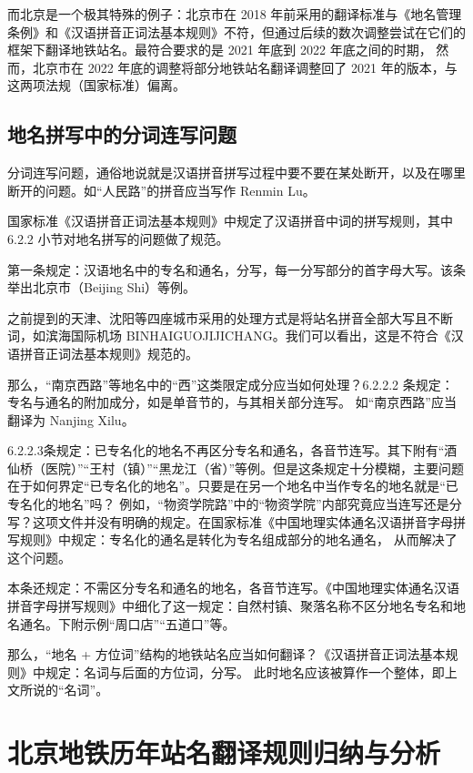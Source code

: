 \documentclass[a4paper,UTF8,12pt]{ctexart}
\begin{document}
        而北京是一个极其特殊的例子：北京市在 2018 年前采用的翻译标准与《地名管理条例》和《汉语拼音正词法基本规则》不符，但通过后续的数次调整尝试在它们的框架下翻译地铁站名。最符合要求的是 2021 年底到 2022 年底之间的时期，
        然而，北京市在 2022 年底的调整将部分地铁站名翻译调整回了 2021 年的版本，与这两项法规（国家标准）偏离。
    \subsection{地名拼写中的分词连写问题}
        分词连写问题，通俗地说就是汉语拼音拼写过程中要不要在某处断开，以及在哪里断开的问题。如“人民路”的拼音应当写作 Renmin Lu。

        国家标准《汉语拼音正词法基本规则》中规定了汉语拼音中词的拼写规则，其中 6.2.2 小节对地名拼写的问题做了规范。\cite{ref6}

        第一条规定：汉语地名中的专名和通名，分写，每一分写部分的首字母大写。该条举出北京市（Beijing Shi）等例。

        之前提到的天津、沈阳等四座城市采用的处理方式是将站名拼音全部大写且不断词，如滨海国际机场 BINHAIGUOJIJICHANG。我们可以看出，这是不符合《汉语拼音正词法基本规则》规范的。
        
        那么，“南京西路”等地名中的“西”这类限定成分应当如何处理？6.2.2.2 条规定：专名与通名的附加成分，如是单音节的，与其相关部分连写。
        如“南京西路”应当翻译为 Nanjing Xilu。

        6.2.2.3条规定：已专名化的地名不再区分专名和通名，各音节连写。其下附有“酒仙桥（医院）”“王村（镇）”“黑龙江（省）”等例。但是这条规定十分模糊，主要问题在于如何界定“已专名化的地名”。只要是在另一个地名中当作专名的地名就是“已专名化的地名”吗？
        例如，“物资学院路”中的“物资学院”内部究竟应当连写还是分写？这项文件并没有明确的规定。在国家标准《中国地理实体通名汉语拼音字母拼写规则》中规定：专名化的通名是转化为专名组成部分的地名通名，\cite{ref7} 从而解决了这个问题。

        本条还规定：不需区分专名和通名的地名，各音节连写。《中国地理实体通名汉语拼音字母拼写规则》中细化了这一规定：自然村镇、聚落名称不区分地名专名和地名通名。下附示例“周口店”“五道口”等。
        
        那么，“地名 + 方位词”结构的地铁站名应当如何翻译？《汉语拼音正词法基本规则》中规定：名词与后面的方位词，分写。\cite{ref9} 此时地名应该被算作一个整体，即上文所说的“名词”。

\section{北京地铁历年站名翻译规则归纳与分析}
\end{document}
